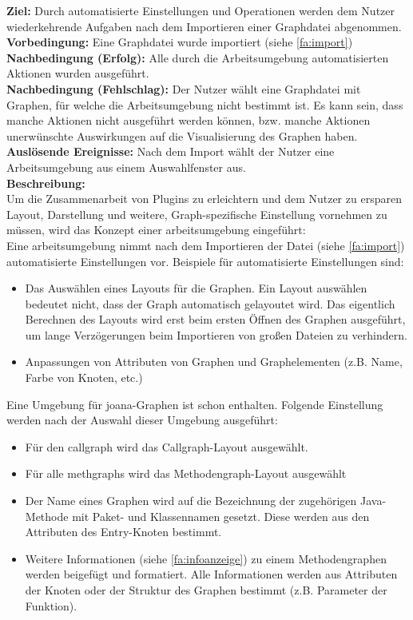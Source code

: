 \label{fa:umgebung}
\textbf{Ziel:} Durch automatisierte Einstellungen und Operationen werden dem Nutzer wiederkehrende Aufgaben nach dem Importieren einer Graphdatei abgenommen.\\
\textbf{Vorbedingung:} Eine Graphdatei wurde importiert (siehe \ref{fa:import})\\
\textbf{Nachbedingung (Erfolg):} Alle durch die Arbeitsumgebung automatisierten Aktionen wurden ausgeführt.\\
\textbf{Nachbedingung (Fehlschlag):} Der Nutzer wählt eine Graphdatei mit Graphen, für welche die Arbeitsumgebung nicht bestimmt ist. Es kann sein, dass manche Aktionen nicht ausgeführt werden können, bzw. manche Aktionen unerwünschte Auswirkungen auf die Visualisierung des Graphen haben.\\
\textbf{Auslösende Ereignisse:} Nach dem Import wählt der Nutzer eine Arbeitsumgebung aus einem Auswahlfenster aus.\\ %
\textbf{Beschreibung:}\\
Um die Zusammenarbeit von Plugins zu erleichtern und dem Nutzer zu ersparen Layout, Darstellung und weitere,
 Graph-spezifische Einstellung vornehmen zu müssen, wird das Konzept einer \gls{arbeitsumgebung} eingeführt:\\
Eine \gls{arbeitsumgebung} nimmt nach dem Importieren der Datei (siehe \ref{fa:import}) automatisierte Einstellungen vor.
Beispiele für automatisierte Einstellungen sind:
\begin{itemize}
  \item Das Auswählen eines Layouts für die Graphen.
    Ein Layout auswählen bedeutet nicht, dass der Graph automatisch gelayoutet wird.
    Das eigentlich Berechnen des Layouts wird erst beim ersten Öffnen des Graphen ausgeführt, um lange Verzögerungen
    beim Importieren von großen Dateien zu verhindern.
  \item Anpassungen von Attributen von Graphen und Graphelementen (z.B. Name, Farbe von Knoten, etc.)
\end{itemize}
Eine Umgebung für \gls{joana}-Graphen ist schon enthalten. Folgende Einstellung werden nach der Auswahl dieser Umgebung ausgeführt:
\begin{itemize}
  \item Für den \gls{callgraph} wird das Callgraph-Layout ausgewählt.
  \item Für alle \glspl{methgraph} wird das Methodengraph-Layout ausgewählt
  \item Der Name eines Graphen wird auf die Bezeichnung der zugehörigen Java-Methode mit Paket- und Klassennamen gesetzt.
    Diese werden aus den Attributen des Entry-Knoten bestimmt.
  \item Weitere Informationen (siehe \ref{fa:infoanzeige}) zu einem Methodengraphen werden beigefügt und formatiert. Alle Informationen werden aus Attributen der Knoten oder der Struktur des Graphen bestimmt (z.B. Parameter der Funktion).
\end{itemize}

